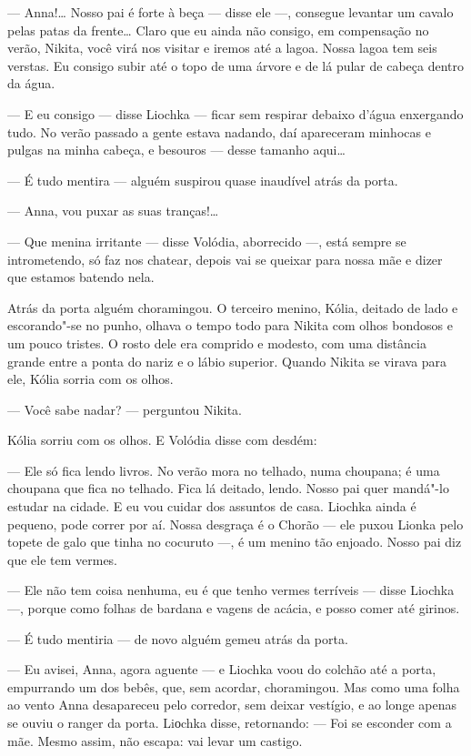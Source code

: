 --- Anna!\ldots{} Nosso pai é forte à beça --- disse ele ---, consegue
levantar um cavalo pelas patas da frente\ldots{} Claro que eu ainda não
consigo, em compensação no verão, Nikita, você virá nos visitar e iremos
até a lagoa. Nossa lagoa tem seis verstas. Eu consigo subir até o topo
de uma árvore e de lá pular de cabeça dentro da água.

--- E eu consigo --- disse Liochka --- ficar sem respirar debaixo d'água
enxergando tudo. No verão passado a gente estava nadando, daí apareceram
minhocas e pulgas na minha cabeça, e besouros --- desse tamanho aqui\ldots{}

--- É tudo mentira --- alguém suspirou quase inaudível atrás da porta.

--- Anna, vou puxar as suas tranças!\ldots{}

--- Que menina irritante --- disse Volódia, aborrecido ---, está sempre
se intrometendo, só faz nos chatear, depois vai se queixar para nossa
mãe e dizer que estamos batendo nela.

Atrás da porta alguém choramingou. O terceiro menino, Kólia, deitado de
lado e escorando"-se no punho, olhava o tempo todo para Nikita com olhos
bondosos e um pouco tristes. O rosto dele era comprido e modesto, com
uma distância grande entre a ponta do nariz e o lábio superior. Quando
Nikita se virava para ele, Kólia sorria com os olhos.

--- Você sabe nadar? --- perguntou Nikita.

Kólia sorriu com os olhos. E Volódia disse com desdém:

--- Ele só fica lendo livros. No verão mora no telhado, numa
choupana; é uma choupana que fica no telhado. Fica lá deitado, lendo.
Nosso pai quer mandá"-lo estudar na cidade. E eu vou cuidar dos assuntos
de casa. Liochka ainda é pequeno, pode correr por aí. Nossa desgraça é o
Chorão --- ele puxou Lionka pelo topete de galo que tinha no cocuruto
---, é um menino tão enjoado. Nosso pai diz que ele tem vermes.

--- Ele não tem coisa nenhuma, eu é que tenho vermes terríveis --- disse
Liochka ---, porque como folhas de bardana e vagens de acácia, e posso
comer até girinos.

--- É tudo mentiria --- de novo alguém gemeu atrás da porta.

--- Eu avisei, Anna, agora aguente --- e Liochka voou do colchão até a
porta, empurrando um dos bebês, que, sem acordar, choramingou. Mas como
uma folha ao vento Anna desapareceu pelo corredor, sem deixar vestígio,
e ao longe apenas se ouviu o ranger da porta. Liоchka disse, retornando:
--- Foi se esconder com a mãe. Mesmo assim, não escapa: vai levar um
castigo.

